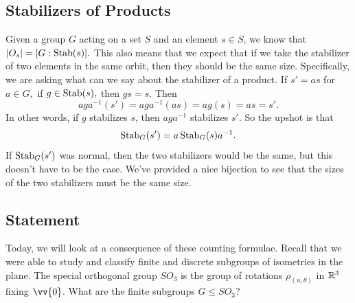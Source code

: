 \subsection{Stabilizers of Products}
Given a group $G$ acting on a set $S$ and an element $s\in S$, we know that $|O_s| = [G:\operatorname{Stab}(s)].$
This also means that we expect that if we take the stabilizer of two elements in the same orbit, then they should be the same size. Specifically, we are asking what can we say about the stabilizer of a product. If $s' = as$ for $a \in G,$ if $g \in \operatorname{Stab}(s),$ then $gs = s.$ 
Then 
\[
aga^{-1}(s') = aga^{-1}(as) = ag(s) = as = s'.
\]
In other words, if $g$ stabilizes $s$, then $aga^{-1}$ stabilizes $s'$. 
So the upshot is that 
\[
\operatorname{Stab}_G(s') = a\operatorname{Stab}_G(s)a^{-1}.
\]
If $\operatorname{Stab}_G(s')$ was normal, then the two stabilizers would be the same, but this doesn't have to be the case. 
We've provided a nice bijection to see that the sizes of the two stabilizers must be the same size.
\subsection{Statement}
Today, we will look at a consequence of these counting formulae.
Recall that we were able to study and classify finite and discrete subgroups of isometries in the plane. 
The special orthogonal group $SO_3$ is the group of rotations $\rho_{(u, \theta)}$ in $\mathbb R^3$ fixing $\vv{0}$. What are the finite subgroups $G \leq SO_3$?

